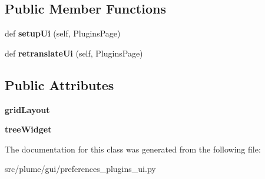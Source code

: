 \subsection*{Public Member Functions}
\begin{DoxyCompactItemize}
\item 
def {\bfseries setup\+Ui} (self, Plugins\+Page)\hypertarget{classplume-creator_1_1src_1_1plume_1_1gui_1_1preferences__plugins__ui_1_1_ui___plugins_page_a18ba3369e80bc18b4074639593f936c9}{}\label{classplume-creator_1_1src_1_1plume_1_1gui_1_1preferences__plugins__ui_1_1_ui___plugins_page_a18ba3369e80bc18b4074639593f936c9}

\item 
def {\bfseries retranslate\+Ui} (self, Plugins\+Page)\hypertarget{classplume-creator_1_1src_1_1plume_1_1gui_1_1preferences__plugins__ui_1_1_ui___plugins_page_a7bcc155fbf47ee27365dbb35d7cab228}{}\label{classplume-creator_1_1src_1_1plume_1_1gui_1_1preferences__plugins__ui_1_1_ui___plugins_page_a7bcc155fbf47ee27365dbb35d7cab228}

\end{DoxyCompactItemize}
\subsection*{Public Attributes}
\begin{DoxyCompactItemize}
\item 
{\bfseries grid\+Layout}\hypertarget{classplume-creator_1_1src_1_1plume_1_1gui_1_1preferences__plugins__ui_1_1_ui___plugins_page_a47fe0dcd6afb0856d226dabb776016b0}{}\label{classplume-creator_1_1src_1_1plume_1_1gui_1_1preferences__plugins__ui_1_1_ui___plugins_page_a47fe0dcd6afb0856d226dabb776016b0}

\item 
{\bfseries tree\+Widget}\hypertarget{classplume-creator_1_1src_1_1plume_1_1gui_1_1preferences__plugins__ui_1_1_ui___plugins_page_a2c4f355602ef35804056c8b13bb25078}{}\label{classplume-creator_1_1src_1_1plume_1_1gui_1_1preferences__plugins__ui_1_1_ui___plugins_page_a2c4f355602ef35804056c8b13bb25078}

\end{DoxyCompactItemize}


The documentation for this class was generated from the following file\+:\begin{DoxyCompactItemize}
\item 
src/plume/gui/preferences\+\_\+plugins\+\_\+ui.\+py\end{DoxyCompactItemize}
